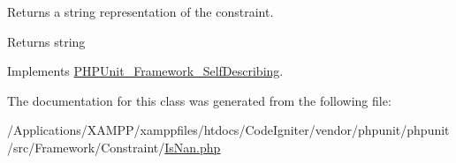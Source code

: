 Returns a string representation of the constraint.

\begin{DoxyReturn}{Returns}
string 
\end{DoxyReturn}


Implements \mbox{\hyperlink{interface_p_h_p_unit___framework___self_describing_a5558c5d549f41597377fa1ea8a1cefa3}{P\+H\+P\+Unit\+\_\+\+Framework\+\_\+\+Self\+Describing}}.



The documentation for this class was generated from the following file\+:\begin{DoxyCompactItemize}
\item 
/\+Applications/\+X\+A\+M\+P\+P/xamppfiles/htdocs/\+Code\+Igniter/vendor/phpunit/phpunit/src/\+Framework/\+Constraint/\mbox{\hyperlink{_is_nan_8php}{Is\+Nan.\+php}}\end{DoxyCompactItemize}
